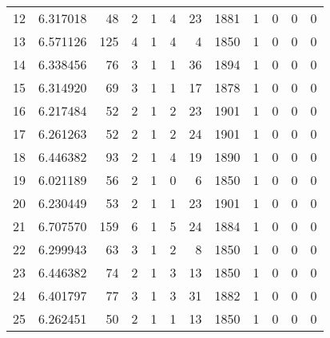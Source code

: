 \begin{tabular}{lrrrrrrrrrrr}
12  &  6.317018 &   48 &      2 &        1 &      4 &              23 &  1881 &               1 &               0 &               0 &               0 \\
13  &  6.571126 &  125 &      4 &        1 &      4 &               4 &  1850 &               1 &               0 &               0 &               0 \\
14  &  6.338456 &   76 &      3 &        1 &      1 &              36 &  1894 &               1 &               0 &               0 &               0 \\
15  &  6.314920 &   69 &      3 &        1 &      1 &              17 &  1878 &               1 &               0 &               0 &               0 \\
16  &  6.217484 &   52 &      2 &        1 &      2 &              23 &  1901 &               1 &               0 &               0 &               0 \\
17  &  6.261263 &   52 &      2 &        1 &      2 &              24 &  1901 &               1 &               0 &               0 &               0 \\
18  &  6.446382 &   93 &      2 &        1 &      4 &              19 &  1890 &               1 &               0 &               0 &               0 \\
19  &  6.021189 &   56 &      2 &        1 &      0 &               6 &  1850 &               1 &               0 &               0 &               0 \\
20  &  6.230449 &   53 &      2 &        1 &      1 &              23 &  1901 &               1 &               0 &               0 &               0 \\
21  &  6.707570 &  159 &      6 &        1 &      5 &              24 &  1884 &               1 &               0 &               0 &               0 \\
22  &  6.299943 &   63 &      3 &        1 &      2 &               8 &  1850 &               1 &               0 &               0 &               0 \\
23  &  6.446382 &   74 &      2 &        1 &      3 &              13 &  1850 &               1 &               0 &               0 &               0 \\
24  &  6.401797 &   77 &      3 &        1 &      3 &              31 &  1882 &               1 &               0 &               0 &               0 \\
25  &  6.262451 &   50 &      2 &        1 &      1 &              13 &  1850 &               1 &               0 &               0 &               0 \\

\end{tabular}
